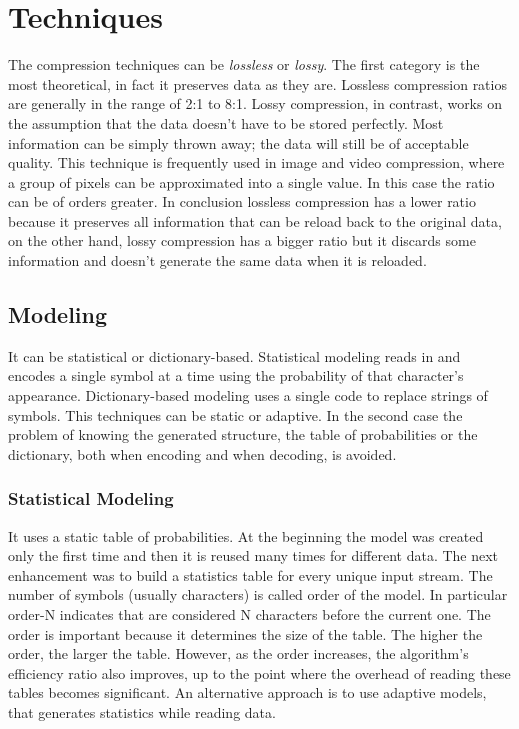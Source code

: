 \documentclass[12pt, a4paper]{report}
\begin{document}
\section{Techniques}

The compression techniques can be \textit{lossless} or \textit{lossy}.
The first category is the most theoretical, in fact it preserves data as they are.
Lossless compression ratios are generally in the range of 2:1 to 8:1.
Lossy compression, in contrast, works on the assumption that the data doesn't have to be stored perfectly.
Most information can be simply thrown away; the data will still be of acceptable quality.
This technique is frequently used in image and video compression, where a group of pixels can be approximated into a single value.
In this case the ratio can be of orders greater.
In conclusion lossless compression has a lower ratio because it preserves all information that can be reload back to the original
data, on the other hand, lossy compression has a bigger ratio but it discards some information and doesn't generate the same data
when it is reloaded.

\subsection{Modeling}

It can be statistical or dictionary-based.
Statistical modeling reads in and encodes a single symbol at a time using the probability of that character's appearance.
Dictionary-based modeling uses a single code to replace strings of symbols.
This techniques can be static or adaptive.
In the second case the problem of knowing the generated structure, the table of probabilities or the dictionary,
both when encoding and when decoding, is avoided.

\subsubsection{Statistical Modeling}

It uses a static table of probabilities.
At the beginning the model was created only the first time and then it is reused many times for different data.
The next enhancement was to build a statistics table for every unique input stream.
The number of symbols (usually characters) is called order of the model.
In particular order-N indicates that are considered N characters before the current one.
The order is important because it determines the size of the table.
The higher the order, the larger the table.
However, as the order increases, the algorithm's efficiency ratio also improves, up to the point where the overhead of
reading these tables becomes significant.
An alternative approach is to use adaptive models, that generates statistics while reading data.
\end{document}
